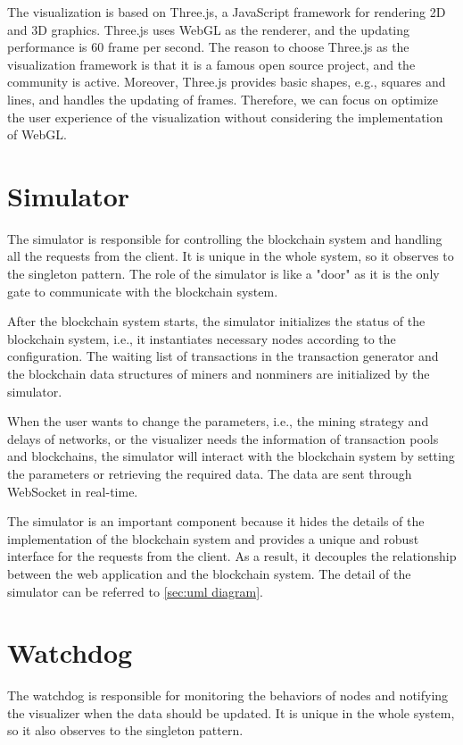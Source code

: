 The visualization is based on Three.js, a JavaScript framework for rendering 2D and 3D graphics. Three.js uses WebGL as the renderer, and the updating performance is 60 frame per second. The reason to choose Three.js as the visualization framework is that it is a famous open source project, and the community is active. Moreover, Three.js provides basic shapes, e.g., squares and lines, and handles the updating of frames. Therefore, we can focus on optimize the user experience of the visualization without considering the implementation of WebGL.

\section{Simulator}

The simulator is responsible for controlling the blockchain system and handling all the requests from the client. It is unique in the whole system, so it observes to the singleton pattern. The role of the simulator is like a "door" as it is the only gate to communicate with the blockchain system.

After the blockchain system starts, the simulator initializes the status of the blockchain system, i.e., it instantiates necessary nodes according to the configuration. The waiting list of transactions in the transaction generator and the blockchain data structures of miners and nonminers are initialized by the simulator. 

When the user wants to change the parameters, i.e., the mining strategy and delays of networks, or the visualizer needs the information of transaction pools and blockchains, the simulator will interact with the blockchain system by setting the parameters or retrieving the required data. The data are sent through WebSocket in real-time.

The simulator is an important component because it hides the details of the implementation of the blockchain system and provides a unique and robust interface for the requests from the client. As a result, it decouples the relationship between the web application and the blockchain system. The detail of the simulator can be referred to \ref{sec:uml diagram}.

\section{Watchdog}

The watchdog is responsible for monitoring the behaviors of nodes and notifying the visualizer when the data should be updated. It is unique in the whole system, so it also observes to the singleton pattern.

